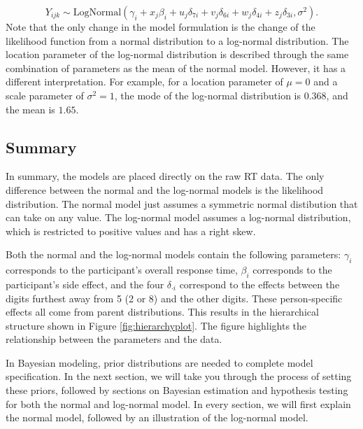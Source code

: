 \documentclass[
  english,
  doc,floatsintext]{apa6}
\begin{document}
\begin{equation}
Y_{ijk} \sim \text{LogNormal}(\gamma_{i} + x_j \beta_{i} + u_j \delta_{7i} + v_j \delta_{6i} + w_j \delta_{4i} + z_j \delta_{3i}, \sigma^2).  
\end{equation}
Note that the only change in the model formulation is the change of the likelihood function from a normal distribution to a log-normal distribution. The location parameter of the log-normal distribution is described through the same combination of parameters as the mean of the normal model. However, it has a different interpretation. For example, for a location parameter of \(\mu = 0\) and a scale parameter of \(\sigma^2 = 1\), the mode of the log-normal distribution is \(0.368\), and the mean is \(1.65\).

\hypertarget{summary}{%
\subsection{Summary}\label{summary}}

In summary, the models are placed directly on the raw RT data. The only difference between the normal and the log-normal models is the likelihood distribution. The normal model just assumes a symmetric normal distibution that can take on any value. The log-normal model assumes a log-normal distribution, which is restricted to positive values and has a right skew.

Both the normal and the log-normal models contain the following parameters: \(\gamma_i\) corresponds to the participant's overall response time, \(\beta_i\) corresponds to the participant's side effect, and the four \(\delta_{\cdot i}\) correspond to the effects between the digits furthest away from 5 (2 or 8) and the other digits. These person-specific effects all come from parent distributions. This results in the hierarchical structure shown in Figure \ref{fig:hierarchyplot}. The figure highlights the relationship between the parameters and the data.

In Bayesian modeling, prior distributions are needed to complete model specification. In the next section, we will take you through the process of setting these priors, followed by sections on Bayesian estimation and hypothesis testing for both the normal and log-normal model. In every section, we will first explain the normal model, followed by an illustration of the log-normal model.
\end{document}
